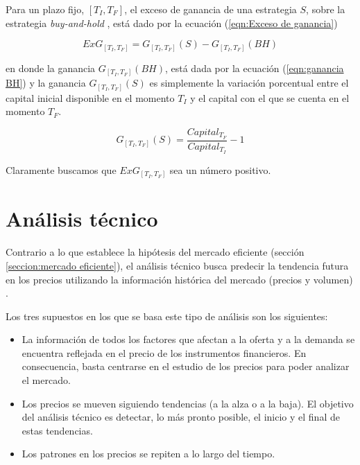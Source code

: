\documentclass[12pt]{scrbook}
\theoremstyle{break}
\theoremstyle{break}
\newcommand{\buyhold}{\textit{buy-and-hold} }
\begin{document}
Para un plazo fijo, $\left[T_{I}, T_{F}\right]$, el exceso de ganancia de una estrategia $S$, sobre la estrategia \buyhold, está dado por la ecuación (\ref{eqn:Exceso de ganancia})

\begin{equation} \label{eqn:Exceso de ganancia}
ExG_{\left[T_{I}, T_{F}\right]} = G_{\left[T_{I}, T_{F}\right]} (S) - G_{\left[T_{I}, T_{F}\right]} (BH)
\end{equation}

en donde la ganancia $G_{\left[T_{I}, T_{F}\right]} (BH)$, está dada por la ecuación (\ref{eqn:ganancia BH}) y la ganancia $G_{\left[T_{I}, T_{F}\right]} (S)$ es simplemente la variación porcentual entre el capital inicial disponible en el momento $T_{I}$ y el capital con el que se cuenta en el momento $T_{F}$.

\begin{equation} \label{eqn:Ganancia estrategia S}
G_{\left[T_{I}, T_{F}\right]}(S) = \dfrac{Capital_{T_F}}{Capital_{T_I} } - 1 
\end{equation}

Claramente buscamos que $ExG_{\left[T_{I}, T_{F}\right]}$ sea un número positivo.

\section{Análisis técnico}
\label{seccion:analisisTecnico}
Contrario a lo que establece la hipótesis del mercado eficiente (sección \ref{seccion:mercado eficiente}), el análisis técnico busca predecir la tendencia futura en los precios utilizando la información histórica del mercado (precios y volumen) \cite{murphy1999technical}.

Los tres supuestos en los que se basa este tipo de análisis son los siguientes:

\begin{itemize}
\item La información de todos los factores que afectan a la oferta y a la demanda se encuentra reflejada en el precio de los instrumentos financieros. En consecuencia, basta centrarse en el estudio de los precios para poder analizar el mercado.

\item Los precios se mueven siguiendo tendencias (a la alza o a la baja). El objetivo del análisis técnico es detectar, lo más pronto posible, el inicio y el final de estas tendencias.

\item Los patrones en los precios se repiten a lo largo del tiempo.
\end{itemize}
\end{document}
